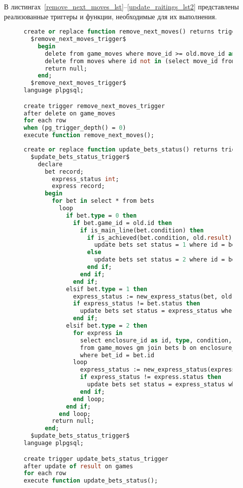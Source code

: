В листингах~\ref{remove_next_moves_lst}--\ref{update_raitings_lst2} представлены реализованные триггеры и функции, необходимые для их выполнения.
\begin{figure}[H]
	\begin{lstlisting}[label=remove_next_moves_lst,caption=Триггер удаления ходов из шахматной партии,language=Caml]
create or replace function remove_next_moves() returns trigger as
  $remove_next_moves_trigger$
    begin
      delete from game_moves where move_id >= old.move_id and game_id = old.game_id;
      delete from moves where id not in (select move_id from game_moves);
      return null;
    end;
  $remove_next_moves_trigger$
language plpgsql;

create trigger remove_next_moves_trigger
after delete on game_moves
for each row
when (pg_trigger_depth() = 0)
execute function remove_next_moves();
	\end{lstlisting}
\end{figure}
\begin{figure}[H]
	\begin{lstlisting}[label=update_bets_status_lst,caption=Триггер проверки выполнения условий ставок,language=Caml]
create or replace function update_bets_status() returns trigger as 
  $update_bets_status_trigger$
    declare
      bet record;
        express_status int;
        express record;
      begin 
        for bet in select * from bets
          loop
            if bet.type = 0 then
              if bet.game_id = old.id then
                if is_main_line(bet.condition) then
                  if is_achieved(bet.condition, old.result) then
                    update bets set status = 1 where id = bet.id;
                  else
                    update bets set status = 2 where id = bet.id;
                  end if;
                end if;
              end if;
            elsif bet.type = 1 then
              express_status := new_express_status(bet, old);
              if express_status != bet.status then
                update bets set status = express_status where id = bet.id;
              end if;
            elsif bet.type = 2 then
              for express in
                select enclosure_id as id, type, condition, coefficient, status, game_id
                from game_moves gm join bets b on enclosure_id = id
                where bet_id = bet.id
              loop
                express_status := new_express_status(express, old);
                if express_status != express.status then
                  update bets set status = express_status where id = express.id;
                end if;
              end loop;
            end if;
          end loop;
        return null;
      end;
  $update_bets_status_trigger$
language plpgsql;

create trigger update_bets_status_trigger
after update of result on games
for each row
execute function update_bets_status();
	\end{lstlisting}
\end{figure}
